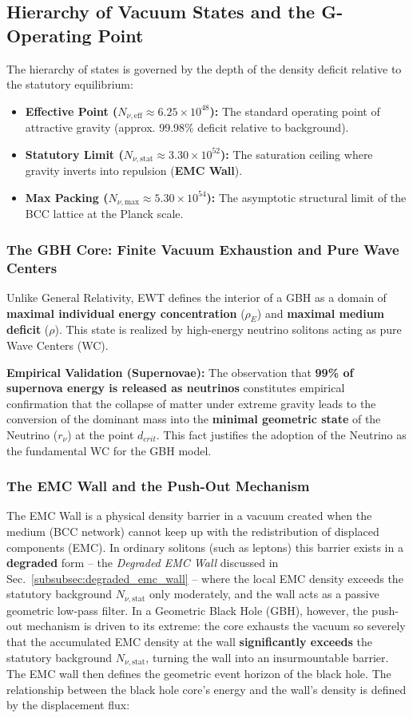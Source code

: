 \documentclass[10pt,a4paper]{article}
\begin{document}
\subsection{Hierarchy of Vacuum States and the G-Operating Point}
The hierarchy of states is governed by the depth of the density deficit relative to the statutory equilibrium:
\begin{itemize}
	\item \textbf{Effective Point ($N_{\nu, \text{eff}} \approx 6.25 \times 10^{48}$):} The standard operating point of attractive gravity (approx. 99.98\% deficit relative to background).
	\item \textbf{Statutory Limit ($N_{\nu, \text{stat}} \approx 3.30 \times 10^{52}$):} The saturation ceiling where gravity inverts into repulsion (\textbf{EMC Wall}).
	\item \textbf{Max Packing ($N_{\nu, \text{max}} \approx 5.30 \times 10^{54}$):} The asymptotic structural limit of the BCC lattice at the Planck scale.
\end{itemize}

\subsubsection*{The GBH Core: Finite Vacuum Exhaustion and Pure Wave Centers}
Unlike General Relativity, EWT defines the interior of a GBH as a domain of \textbf{maximal individual energy concentration} ($\rho_E$) and \textbf{maximal medium deficit} ($\rho$). This state is realized by high-energy neutrino solitons acting as pure Wave Centers (WC).

\textbf{Empirical Validation (Supernovae):} The observation that \textbf{99\% of supernova energy is released as neutrinos} constitutes empirical confirmation that the collapse of matter under extreme gravity leads to the conversion of the dominant mass into the \textbf{minimal geometric state} of the Neutrino ($r_{\nu}$) at the point $d_{crit}$. This fact justifies the adoption of the Neutrino as the fundamental WC for the GBH model.

\subsubsection*{The EMC Wall and the Push-Out Mechanism}
The EMC Wall is a physical density barrier in a vacuum created when the medium (BCC network) cannot keep up with the redistribution of displaced components (EMC). In ordinary solitons (such as leptons) this barrier exists in a \textbf{degraded} form – the \textit{Degraded EMC Wall} discussed in Sec.~\ref{subsubsec:degraded_emc_wall} – where the local EMC density exceeds the statutory background $N_{\nu,\text{stat}}$ only moderately, and the wall acts as a passive geometric low-pass filter. In a Geometric Black Hole (GBH), however, the push-out mechanism is driven to its extreme: the core exhausts the vacuum so severely that the accumulated EMC density at the wall \textbf{significantly exceeds} the statutory background $N_{\nu,\text{stat}}$, turning the wall into an insurmountable barrier. The EMC wall then defines the geometric event horizon of the black hole. The relationship between the black hole core's energy and the wall's density is defined by the displacement flux:
\end{document}
